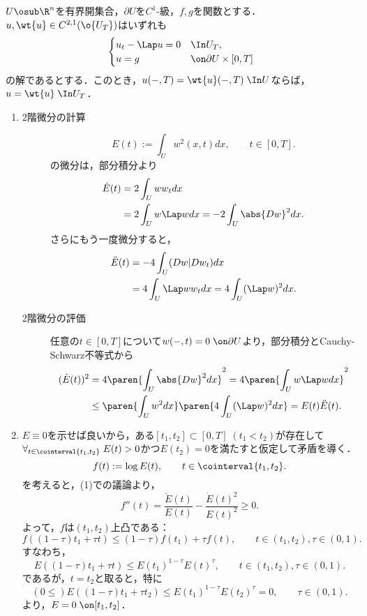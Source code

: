 \documentclass[uplatex,dvipdfmx]{jsreport}
\begin{document}
\begin{theorem}
    $U\osub\R^n$を有界開集合，$\partial U$を$C^1$-級，$f,g$を関数とする．$u,\wt{u}\in C^{2,1}(\o{U_T})$はいずれも
    \[\begin{cases}
        u_t-\Lap u=0&\In U_T,\\
        u=g&\on\partial U\times[0,T]
    \end{cases}\]
    の解であるとする．このとき，$u(-,T)=\wt{u}(-,T)\;\In U$ならば，$u=\wt{u}\;\In U_T$．
\end{theorem}
\begin{Proof}\mbox{}
    \begin{enumerate}
        \item 
        \begin{description}
            \item[2階微分の計算] \[E(t):=\int_Uw^2(x,t)dx,\qquad t\in[0,T].\]
            の微分は，部分積分より
            \begin{align*}
                \dot{E}(t)&=2\int_Uww_tdx\\
                &=2\int_Uw\Lap wdx=-2\int_U\abs{Dw}^2dx.
            \end{align*}
            さらにもう一度微分すると，
            \begin{align*}
                \ddot{E}(t)&=-4\int_U(Dw|Dw_t)dx\\
                &=4\int_U\Lap ww_tdx=4\int_U(\Lap w)^2dx.
            \end{align*}
            \item[2階微分の評価] 任意の$t\in[0,T]$について$w(-,t)=0\;\on\partial U$より，部分積分とCauchy-Schwarz不等式から
            \begin{align*}
                (\dot{E}(t))^2&=4\paren{\int_U\abs{Dw}^2dx}^2=4\paren{\int_Uw\Lap wdx}^2\\
                &\le\paren{\int_Uw^2dx}\paren{4\int_U(\Lap w)^2dx}=E(t)\ddot{E}(t).
            \end{align*}
        \end{description}
        \item $E\equiv0$を示せば良いから，ある$[t_1,t_2]\subset[0,T]\;(t_1<t_2)$が存在して$\forall_{t\in\cointerval{t_1,t_2}}\;E(t)>0$かつ$E(t_2)=0$を満たすと仮定して矛盾を導く．
        \[f(t):=\log E(t),\qquad t\in\cointerval{t_1,t_2}.\]
        を考えると，(1)での議論より，
        \[f''(t)=\frac{\ddot{E}(t)}{E(t)}-\frac{\dot{E}(t)^2}{E(t)^2}\ge0.\]
        よって，$f$は$(t_1,t_2)$上凸である：
        \[f((1-\tau)t_1+\tau t)\le(1-\tau)f(t_1)+\tau f(t),\qquad t\in(t_1,t_2),\tau\in(0,1).\]
        すなわち，
        \[E((1-\tau)t_1+\tau t)\le E(t_1)^{1-\tau}E(t)^{\tau},\qquad t\in(t_1,t_2),\tau\in(0,1).\]
        であるが，$t=t_2$と取ると，特に
        \[(0\le)E((1-\tau)t_1+\tau t_2)\le E(t_1)^{1-\tau}E(t_2)^\tau=0,\qquad\tau\in(0,1).\]
        より，$E=0\;\on[t_1,t_2]$．
    \end{enumerate}
\end{Proof}
\end{document}
